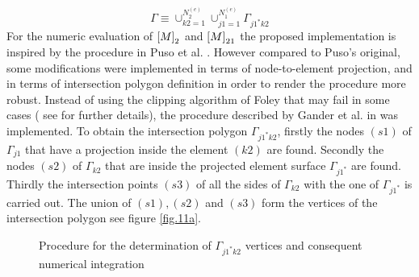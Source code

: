 \begin{equation}
\label{eq.52}
\Gamma\equiv\cup_{k2=1}^{N^{(e)}_2}\cup_{j1=1}^{N^{(e)}_1}\Gamma_{j1^*k2}
\end{equation}
 For the numeric evaluation of $\left[{M}\right]_2$ and $\left[{M}\right]_{21}$ the proposed implementation is inspired by the procedure in Puso et al. \cite{puso20043d}. However compared to Puso's original, some modifications were implemented in terms of node-to-element projection, and in terms of intersection polygon definition in order to render the procedure more robust. Instead of using the clipping algorithm of Foley \cite{foley1996computer} that may fail in some cases ( see \cite{gander2013algorithm} for further details), the procedure described by Gander et al. in \cite{gander2013algorithm} was implemented.
 To obtain the intersection polygon $\Gamma_{j1^*k2}$, firstly the nodes $(s1)$ of $\Gamma_{j1}$ that have a projection inside the element $(k2)$ are found.
Secondly the nodes $(s2)$ of $\Gamma_{k2}$ that are inside the projected element surface $\Gamma_{j1^*}$ are found.
Thirdly the intersection points $(s3)$ of all the sides of $\Gamma_{k2}$ with the one of $\Gamma_{j1^*}$ is carried out. The union of $(s1),(s2)$ and $(s3)$ form the vertices of the intersection polygon see figure \ref{fig.11a}.
\\
\begin{figure}[!ht]
     \caption{Procedure for the determination of  $\Gamma_{j1^*k2}$ vertices and consequent numerical integration }
     \label{fig.11}
   \end{figure}
